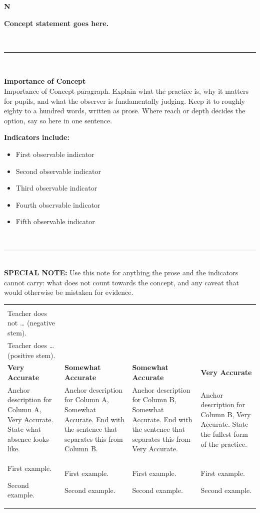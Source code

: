 \documentclass[10pt,a4paper]{article}
\makeatletter
\renewcommand{\arraystretch}{1.25}
\newcommand{\conceptheader}[2]{%
  \noindent
  \begin{minipage}[c]{13mm}\raggedright
    {\fontsize{30}{30}\selectfont\bfseries\color{tnavy}#1}
  \end{minipage}%
  \begin{minipage}[c]{\dimexpr\linewidth-13mm\relax}\RaggedRight
    {\large\bfseries #2}
  \end{minipage}\\[1.5mm]
  \textcolor{tnavy}{\rule{\linewidth}{1.1pt}}\\[2mm]}
\newcommand{\twopane}[2]{%
  \noindent
  \begin{minipage}[t]{0.475\linewidth}\RaggedRight
    {\bfseries\small Importance of Concept}\\[1.4mm]
    \footnotesize #1 \normalsize
  \end{minipage}\hfill
  \begin{minipage}[t]{0.475\linewidth}\RaggedRight
    {\bfseries\small Indicators include:}\\[0.6mm]
    #2
  \end{minipage}\\[2mm]}
\newcommand{\specialnote}[1]{%
  \noindent\textcolor{trule}{\rule{\linewidth}{0.4pt}}\\[1.2mm]
  {\footnotesize\textbf{SPECIAL NOTE:} #1}\\[2mm]}
\newlength{\gridw}\newlength{\stemw}\newlength{\stemh}\newlength{\stemtop}
\newcommand{\stemrow}[2]{%
  \setlength{\stemtop}{1.15\ht\strutbox}%
  \setlength{\stemw}{0.5\dimexpr\gridw-2\arrayrulewidth\relax}%
  \sbox{\stemAbox}{\begin{minipage}[t]{\dimexpr\stemw-4.4mm\relax}\RaggedRight
      \footnotesize\textbf{Column A}\\#1\end{minipage}}%
  \sbox{\stemBbox}{\begin{minipage}[t]{\dimexpr\stemw-4.4mm\relax}\RaggedRight
      \footnotesize\textbf{Column B}\\#2\end{minipage}}%
  \setlength{\stemh}{\dimexpr\ht\stemAbox+\dp\stemAbox\relax}%
  \ifdim\dimexpr\ht\stemBbox+\dp\stemBbox\relax>\stemh
    \setlength{\stemh}{\dimexpr\ht\stemBbox+\dp\stemBbox\relax}\fi
  \setlength{\stemh}{\dimexpr\stemtop+\stemh+2.6mm\relax}%
  \begin{tikzpicture}[inner sep=0pt,outer sep=0pt,baseline=0pt]
    \shade[left color=gradA,middle color=gradM,right color=gradB]
      (0,\stemtop) rectangle (\dimexpr\gridw-2\arrayrulewidth\relax,
                              \dimexpr\stemtop-\stemh\relax);
    \draw[black,line width=\arrayrulewidth]
      (\stemw,\stemtop) -- (\stemw,\dimexpr\stemtop-\stemh\relax);
    \node[anchor=north west] at (2.2mm,\dimexpr\stemtop-1.2mm\relax)
      {\usebox{\stemAbox}};
    \node[anchor=north west] at (\dimexpr\stemw+2.2mm\relax,
                                 \dimexpr\stemtop-1.2mm\relax)
      {\usebox{\stemBbox}};
  \end{tikzpicture}}
\newcommand{\scoregrid}[4]{%
  \setlength{\gridw}{\linewidth}%
  \renewcommand{\arraystretch}{1.06}%
  \noindent\footnotesize
  \begin{tabularx}{\linewidth}{|>{\RaggedRight\arraybackslash}X
                               |>{\RaggedRight\arraybackslash}X
                               |>{\RaggedRight\arraybackslash}X
                               |>{\RaggedRight\arraybackslash}X|}
  \hline
  \multicolumn{4}{|@{}l@{}|}{\stemrow{#1}{#2}}\\
  \hline
  \rowcolor{tsub}
  \centering\arraybackslash\textbf{Very Accurate} &
  \centering\arraybackslash\textbf{Somewhat Accurate} &
  \centering\arraybackslash\textbf{Somewhat Accurate} &
  \centering\arraybackslash\textbf{Very Accurate}\\
  \hline
  #3\\
  \hline
  \rowcolor{texfill} #4\\
  \hline
  \end{tabularx}\normalsize}
\makeatother
\begin{document}


\conceptheader{N}{Concept statement goes here.}
\twopane{Importance of Concept paragraph. Explain what the practice is, why it matters for pupils, and
what the observer is fundamentally judging. Keep it to roughly eighty to a hundred words, written as
prose. Where reach or depth decides the option, say so here in one sentence.}{%
\footnotesize\begin{itemize}
  \item First observable indicator
  \item Second observable indicator
  \item Third observable indicator
  \item Fourth observable indicator
  \item Fifth observable indicator
\end{itemize}\normalsize}
\specialnote{Use this note for anything the prose and the indicators cannot carry: what does not count
towards the concept, and any caveat that would otherwise be mistaken for evidence.}
\scoregrid{Teacher does not \ldots{} (negative stem).}{Teacher does \ldots{} (positive stem).}{%
\footnotesize Anchor description for Column A, Very Accurate. State what absence looks like. &
\footnotesize Anchor description for Column A, Somewhat Accurate. End with the sentence that separates this from Column B. &
\footnotesize Anchor description for Column B, Somewhat Accurate. End with the sentence that separates this from Very Accurate. &
\footnotesize Anchor description for Column B, Very Accurate. State the fullest form of the practice.
}{%
\begin{exlist}\item First example.\item Second example.\end{exlist} &
\begin{exlist}\item First example.\item Second example.\end{exlist} &
\begin{exlist}\item First example.\item Second example.\end{exlist} &
\begin{exlist}\item First example.\item Second example.\end{exlist}
}
\end{document}
